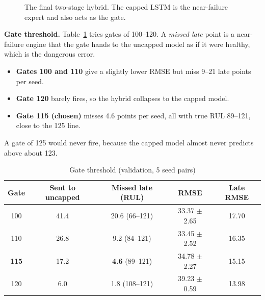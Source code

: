 \documentclass[conference]{IEEEtran}
\begin{document}
\begin{figure}[t]
\centering
{}
\caption{The final two-stage hybrid. The capped LSTM is the near-failure expert and also acts as the gate.}
\label{fig:hybrid}
\end{figure}

\textbf{Gate threshold.} Table~\ref{tab:gate} tries gates of 100--120. A \emph{missed late} point is a near-failure engine that the gate hands to the uncapped model as if it were healthy, which is the dangerous error.
\begin{itemize}
  \item \textbf{Gates 100 and 110} give a slightly lower RMSE but miss 9--21 late points per seed.
  \item \textbf{Gate 120} barely fires, so the hybrid collapses to the capped model.
  \item \textbf{Gate 115 (chosen)} misses 4.6 points per seed, all with true RUL 89--121, close to the 125 line.
\end{itemize}
A gate of 125 would never fire, because the capped model almost never predicts above about 123.

\begin{table}[t]
\centering
\caption{Gate threshold (validation, 5 seed pairs)}
\label{tab:gate}
\setlength{\tabcolsep}{4pt}
\begin{tabular}{@{}ccccc@{}}
\toprule
Gate & Sent to uncapped & Missed late (RUL) & RMSE & Late RMSE \\
\midrule
100 & 41.4 & 20.6 (66--121) & 33.37 $\pm$ 2.65 & 17.70 \\
110 & 26.8 & 9.2 (84--121) & 33.45 $\pm$ 2.52 & 16.35 \\
\textbf{115} & 17.2 & \textbf{4.6} (89--121) & 34.78 $\pm$ 2.27 & 15.15 \\
120 & 6.0 & 1.8 (108--121) & 39.23 $\pm$ 0.59 & 13.98 \\
\bottomrule
\end{tabular}
\end{table}
\end{document}
